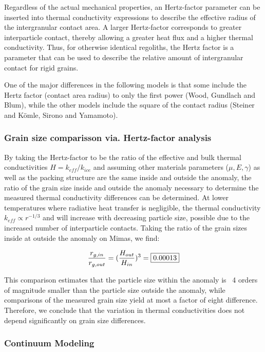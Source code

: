 \documentclass[11pt]{article} %
\begin{document}
\begin{itemize}
	Regardless of the actual mechanical properties, an Hertz-factor parameter can be inserted into thermal conductivity expressions to describe the effective radius of the intergranular contact area. A larger Hertz-factor corresponds to greater interparticle contact, thereby allowing a greater heat flux and a higher thermal conductivity. Thus, for otherwise identical regoliths, the Hertz factor is a parameter that can be used to describe the relative amount of intergranular contact for rigid grains. 

	One of the major differences in the following models is that some include the Hertz factor (contact area radius) to only the first power (Wood, Gundlach and Blum), while the other models include the square of the contact radius (Steiner and K\"{o}mle, Sirono and Yamamoto).


\subsubsection{Grain size comparisson via. Hertz-factor analysis}
	
	By taking the Hertz-factor to be the ratio of the effective and bulk thermal conductivities $H = k_{eff}/k_{ice}$ and assuming other materials parameters ($\mu, E, \gamma$) as well as the packing structure are the same inside and outside the anomaly, the ratio of the grain size inside and outside the anomaly necessary to determine the measured thermal conductivity differences can be determined. At lower temperatures where radiative heat transfer is negligible, the thermal conductivity $k_{eff} \varpropto r^{-1/3}$ and will increase with decreasing particle size, possible due to the increased number of interparticle contacts. Taking the ratio of the grain sizes inside at outside the anomaly on Mimas, we find:
	
	\begin{equation}
	 \frac{r_{g,in}}{r_{g,out}} = (\frac{H_{out}}{H_{in}})^{3} = \fbox{0.00013}
	 \end{equation}

	This comparison estimates that the particle size within the anomaly is ~4 orders of magnitude smaller than the particle size outside the anomaly, while comparisons of the measured grain size yield at most a factor of eight difference. Therefore, we conclude that the variation in thermal conductivities does not depend significantly on grain size differences.

\subsubsection{Continuum Modeling}


\end{itemize}
\end{document}
